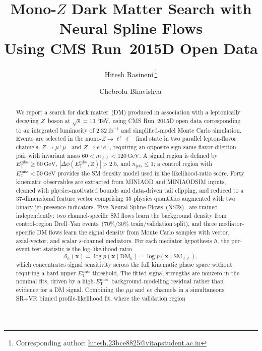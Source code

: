 \documentclass[11pt,a4paper,twocolumn]{article}
\title{%
  Mono-\texorpdfstring{$Z$}{Z} Dark Matter Search with Neural Spline Flows \\ Using CMS Run~2015D Open Data
}
\author[1,$\dagger$]{Hitesh Rasineni\,\orcidlink{0009-0003-4958-0915}\thanks{Corresponding author: \url{hitesh.23bce8825@vitapstudent.ac.in}}}
\author[2,$\dagger$]{Chebrolu Bhavishya\,\orcidlink{0009-0000-9770-0975}}
\affil[1]{VIT-AP University, Amaravati, 522241, India \\ \centerline{\small *hitesh.23bce8825@vitapstudent.ac.in}}
\affil[2]{Mohan Babu University, Tirupati, 517102, India \\ \centerline{\small 23102A041122@mbu.asia}}
\date{}
\newcommand{\GeV}{\text{GeV}}
\newcommand{\MET}{\ensuremath{E_{\mathrm{T}}^{\mathrm{miss}}}}
\begin{document}
\maketitle

\begingroup
\renewcommand{\thefootnote}{\fnsymbol{footnote}}
\endgroup

\begin{abstract}
  We report a search for dark matter~(DM) produced in association with a
  leptonically decaying $Z$~boson at $\sqrt{s}=13$~TeV, using CMS Run~2015D
  open data corresponding to an integrated luminosity of $2.32~\mathrm{fb}^{-1}$
  and simplified-model Monte Carlo simulation.
  Events are selected in the mono-$Z\to\ell^+\ell^-$ final state in two
  parallel lepton-flavor channels, $Z\to\mu^+\mu^-$ and $Z\to e^+e^-$,
  requiring an opposite-sign same-flavor dilepton pair with invariant mass
  $60 < m_{\ell\ell} < 120\,\GeV$.
  A signal region is defined by $\MET \ge 50\,\GeV$,
  $|\Delta\phi(\MET, Z)| > 2.5$, and $n_{\mathrm{jets}} \le 1$;
  a control region with $\MET < 50\,\GeV$ provides the SM density model used in
  the likelihood-ratio score.
  Forty kinematic observables are extracted from MINIAOD and MINIAODSIM inputs,
  cleaned with physics-motivated bounds and data-driven tail clipping, and
  reduced to a 37-dimensional feature vector comprising 35 physics quantities
  augmented with two binary jet-presence indicators.
  Five Neural Spline Flows~(NSFs)~\cite{Durkan2019,Papamakarios2021} are trained
  independently: two channel-specific SM flows learn the background density from
  control-region Drell--Yan events~(70\%/30\% train/validation split), and three
  mediator-specific DM flows learn the signal density from Monte Carlo samples
  with vector, axial-vector, and scalar $s$-channel mediators.
  For each mediator hypothesis $h$, the per-event test statistic is the
  log-likelihood ratio
  \begin{equation*}
    \mathcal{S}_h(\mathbf{x})
    = \log p(\mathbf{x}\mid\mathrm{DM}_h)
    - \log p(\mathbf{x}\mid\mathrm{SM}_{\ell\ell}),
  \end{equation*}
  which concentrates signal sensitivity across the full kinematic phase space
  without requiring a hard upper $\MET$ threshold.
  The fitted signal strengths are nonzero in the nominal fits, driven by a
  high-\MET\ background-modelling residual rather than evidence for a DM signal.
  Combining the $\mu\mu$ and $ee$ channels in a simultaneous SR+VR
  binned profile-likelihood fit, where the validation region

\end{abstract}
\end{document}
